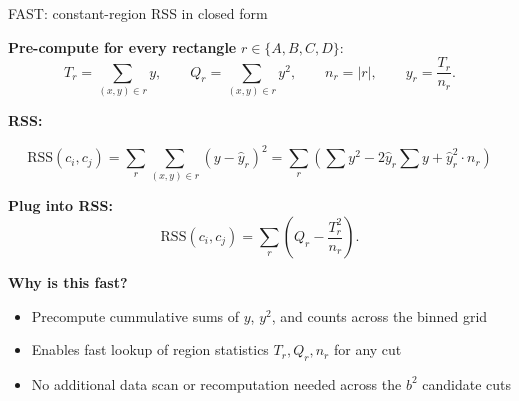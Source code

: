 \documentclass[11pt,compress,t,notes=noshow, aspectratio=169, xcolor=table]{beamer}
\begin{document}
\begin{frame}{FAST: constant-region RSS in closed form}

\small
\textbf{Pre-compute for every rectangle}  
\(r\in\{A,B,C,D\}\):
\[
T_r=\!\!\sum_{(x,y)\in r}\!y, \qquad 
Q_r=\!\!\sum_{(x,y)\in r}\!y^{2}, \qquad 
n_r=|r|, \qquad
y_r=\frac{T_r}{n_r}.
\]

\medskip
\textbf{RSS:}

\[
\text{RSS}(c_i, c_j) = \sum_{r} \sum_{(x, y) \in r} (y - \hat{y}_r)^2
= \sum_{r} \left( \sum y^2 - 2 \hat{y}_r \sum y + \hat{y}_r^2 \cdot n_r \right)
\]

\medskip
\textbf{Plug into RSS:}
\[
\text{RSS}(c_i,c_j)=
\sum_{r}\!\left(
      Q_r-\frac{T_r^{2}}{n_r}\right).
\]

\medskip
\textbf{Why is this fast?}
\begin{itemize}
  \item Precompute cummulative sums of \(y\), \(y^2\), and counts across the binned grid
  \item Enables fast lookup of region statistics \(T_r, Q_r, n_r\) for any cut
  \item No additional data scan or recomputation needed across the \(b^2\) candidate cuts
\end{itemize}

\end{frame}










\end{document}
